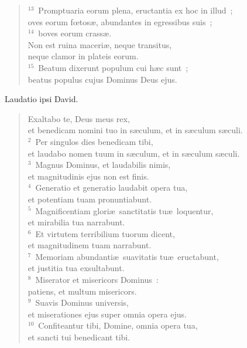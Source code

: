 \begin{flushleft}
\begin{verse}
${}^{13}$~Promptuaria eorum plena, eructantia ex hoc in illud~;\\ oves eorum fœtos\ae , abundantes in egressibus suis~;\\
${}^{14}$~boves eorum crass\ae .\\ Non est ruina maceri\ae , neque transitus,\\ neque clamor in plateis eorum.\\
${}^{15}$~Beatum dixerunt populum cui h\ae c sunt~;\\ beatus populus cujus Dominus Deus ejus.\end{verse}\end{flushleft}



\bchapter
\lettrine[lines=3,image=true,loversize=0.05,lraise=-0.03]{L}{}audatio ipsi David. \begin{flushleft}\begin{verse}\vspace{6pt}Exaltabo te, Deus meus rex,\\ et benedicam nomini tuo in s\ae culum, et in s\ae culum s\ae culi.\\
${}^{2}$~Per singulos dies benedicam tibi,\\ et laudabo nomen tuum in s\ae culum, et in s\ae culum s\ae culi.\\
${}^{3}$~Magnus Dominus, et laudabilis nimis,\\ et magnitudinis ejus non est finis.\\
${}^{4}$~Generatio et generatio laudabit opera tua,\\ et potentiam tuam pronuntiabunt.\\
${}^{5}$~Magnificentiam glori\ae\ sanctitatis tu\ae\ loquentur,\\ et mirabilia tua narrabunt.\\
${}^{6}$~Et virtutem terribilium tuorum dicent,\\ et magnitudinem tuam narrabunt.\\
${}^{7}$~Memoriam abundanti\ae\ suavitatis tu\ae\ eructabunt,\\ et justitia tua exsultabunt.\\
${}^{8}$~Miserator et misericors Dominus~:\\ patiens, et multum misericors.\\
${}^{9}$~Suavis Dominus universis,\\ et miserationes ejus super omnia opera ejus.\\
${}^{10}$~Confiteantur tibi, Domine, omnia opera tua,\\ et sancti tui benedicant tibi.\\

\end{verse}
\end{flushleft}

